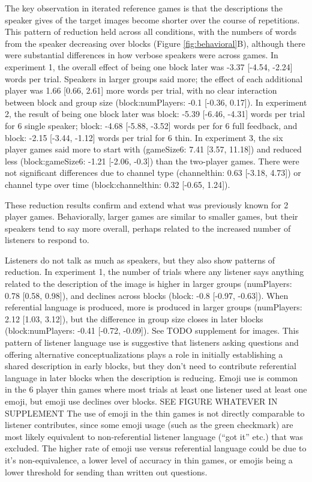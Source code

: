 \documentclass[
  english,
  a4paper,
]{article}
\begin{document}
The key observation in iterated reference games is that the descriptions the speaker gives of the target images become shorter over the course of repetitions. This pattern of reduction held across all conditions, with the numbers of words from the speaker decreasing over blocks (Figure \ref{fig:behavioral}B), although there were substantial differences in how verbose speakers were across games. In experiment 1, the overall effect of being one block later was -3.37 {[}-4.54, -2.24{]} words per trial. Speakers in larger groups said more; the effect of each additional player was 1.66 {[}0.66, 2.61{]} more words per trial, with no clear interaction between block and group size (block:numPlayers: -0.1 {[}-0.36, 0.17{]}). In experiment 2, the result of being one block later was block: -5.39 {[}-6.46, -4.31{]} words per trial for 6 single speaker; block: -4.68 {[}-5.88, -3.52{]} words per for 6 full feedback, and block: -2.15 {[}-3.44, -1.12{]} words per trial for 6 thin. In experiment 3, the six player games said more to start with (gameSize6: 7.41 {[}3.57, 11.18{]}) and reduced less (block:gameSize6: -1.21 {[}-2.06, -0.3{]}) than the two-player games. There were not significant differences due to channel type (channelthin: 0.63 {[}-3.18, 4.73{]}) or channel type over time (block:channelthin: 0.32 {[}-0.65, 1.24{]}).

These reduction results confirm and extend what was previously known for 2 player games. Behaviorally, larger games are similar to smaller games, but their speakers tend to say more overall, perhaps related to the increased number of listeners to respond to.

Listeners do not talk as much as speakers, but they also show patterns of reduction. In experiment 1, the number of trials where any listener says anything related to the description of the image is higher in larger groups (numPlayers: 0.78 {[}0.58, 0.98{]}), and declines across blocks (block: -0.8 {[}-0.97, -0.63{]}). When referential language is produced, more is produced in larger groups (numPlayers: 2.12 {[}1.03, 3.12{]}), but the difference in group size closes in later blocks (block:numPlayers: -0.41 {[}-0.72, -0.09{]}). See TODO supplement for images. This pattern of listener language use is suggestive that listeners asking questions and offering alternative conceptualizations plays a role in initially establishing a shared description in early blocks, but they don't need to contribute referential language in later blocks when the description is reducing.
Emoji use is common in the 6 player thin games where most trials at least one listener used at least one emoji, but emoji use declines over blocks. SEE FIGURE WHATEVER IN SUPPLEMENT The use of emoji in the thin games is not directly comparable to listener contributes, since some emoji usage (such as the green checkmark) are most likely equivalent to non-referential listener language (``got it'' etc.) that was excluded. The higher rate of emoji use versus referential language could be due to it's non-equivalence, a lower level of accuracy in thin games, or emojis being a lower threshold for sending than written out questions.
\end{document}
